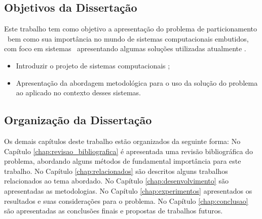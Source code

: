 


\subsection{Objetivos da Dissertação}
	Este trabalho tem como objetivo a apresentação do problema de particionamento \hs\ bem como sua importância no mundo de sistemas computacionais embutidos, com foco em sistemas \wearables\ apresentando algumas soluções utilizadas atualmente .

    \begin{itemize}
    	\item Introduzir o projeto de sistemas computacionais \wearable;
        \item Apresentação da abordagem metodológica para o uso da solução do problema ao aplicado no contexto desses sistemas.
    \end{itemize}


\subsection{Organização da Dissertação}
	Os demais capítulos deste trabalho estão organizados da seguinte forma: No Capítulo \ref{chap:revisao_bibliografica} é apresentada uma revisão bibliográfica do problema, abordando alguns métodos de fundamental importância para este trabalho. No Capítulo \ref{chap:relacionados} são descritos alguns trabalhos relacionados ao tema abordado. No Capítulo \ref{chap:desenvolvimento} são apresentadas as metodologias. No Capítulo \ref{chap:experimentos}  apresentados os resultados e suas considerações para o problema. No Capítulo \ref{chap:conclusao} são apresentadas as conclusões finais e propostas de trabalhos futuros.
